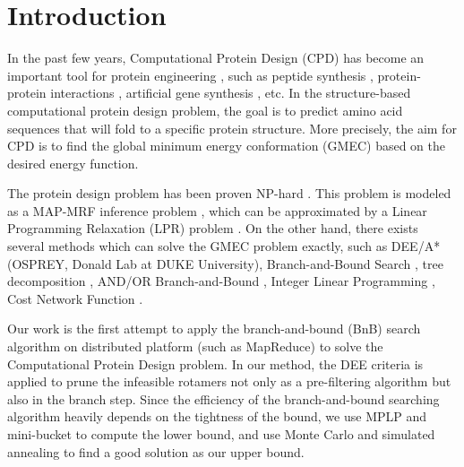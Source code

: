 \section{Introduction}
In the past few years, Computational Protein Design (CPD) has become an important tool for protein engineering \cite[]{alvizo2007computational}, such as peptide synthesis \cite[]{ottl1996design}, protein-protein interactions \cite[]{roberts2012computational}, artificial gene synthesis \cite[]{villalobos2006gene}, etc. In the structure-based computational protein design problem, the goal is to predict amino acid sequences that will fold to a specific protein structure. More precisely, the aim for CPD is to find the global minimum energy conformation (GMEC) based on the desired energy function.

The protein design problem has been proven NP-hard \cite[]{pierce2002protein}. This problem is modeled as a MAP-MRF inference problem \cite[]{yanover2006linear}, which can be approximated by a Linear Programming Relaxation (LPR) problem \cite[]{wainwright2005map}. On the other hand, there exists several methods which can solve the GMEC problem exactly, such as DEE/A* (OSPREY, Donald Lab at DUKE University), Branch-and-Bound Search \cite[]{hong2006protein}, tree decomposition \cite[]{xu2006fast}, AND/OR Branch-and-Bound \cite[]{marinescu2009and}, Integer Linear Programming \cite[]{kingsford2005solving}, Cost Network Function \cite[]{traore2013new}.

Our work is the first attempt to apply the branch-and-bound (BnB) search algorithm on distributed platform (such as MapReduce) to solve the Computational Protein Design problem. In our method, the DEE criteria is applied to prune the infeasible rotamers not only as a pre-filtering algorithm but also in the branch step. Since the efficiency of the branch-and-bound searching algorithm heavily depends on the tightness of the bound, we use MPLP \cite[]{globerson2008fixing} and mini-bucket \cite[]{rollon2010evaluating} to compute the lower bound, and use Monte Carlo and simulated annealing to find a good solution as our upper bound. 